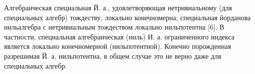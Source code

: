 \documentclass[10pt]{article}
\begin{document}
Алгебраическая специальная Й. а., удовлетворяющая нетривиальному (для специальных алгебр) тождеству, локально конечномерна; специальная йорданова нильалгебра с нетривиальным тождеством локально нильпотентна [6]. В частности, специальная алгебраическая (ниль) И. а. ограниченного индекса является локально конечномерной (нильпотентной). Конечно порожденная разрешимая Й. а. нильпотентна, в общем случае это не верно даже для специальных алгебр.
\end{document}
